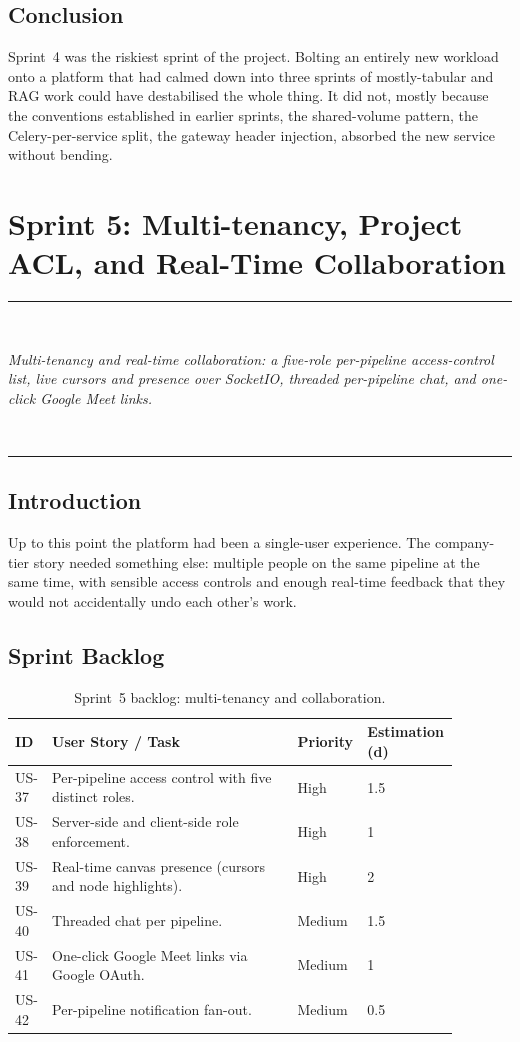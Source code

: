 \documentclass[12pt, a4paper, oneside]{report}
\newcommand{\chapterabstract}[1]{%
  \vspace*{1.2cm}%
  \begin{center}%
  \rule{0.45\textwidth}{0.4pt}\\[0.8em]%
  \begin{minipage}{0.82\textwidth}\centering\itshape\large #1\end{minipage}\\[0.8em]%
  \rule{0.45\textwidth}{0.4pt}%
  \end{center}%
  \vspace*{\fill}\clearpage}
\begin{document}
\section*{Conclusion}

Sprint~4 was the riskiest sprint of the project. Bolting an entirely
new workload onto a platform that had calmed down into three sprints
of mostly-tabular and RAG work could have destabilised the whole
thing. It did not, mostly because the conventions established in
earlier sprints, the shared-volume pattern, the Celery-per-service
split, the gateway header injection, absorbed the new service
without bending.

\chapter{Sprint 5: Multi-tenancy, Project ACL, and Real-Time Collaboration}
\chapterabstract{Multi-tenancy and real-time collaboration: a five-role
per-pipeline access-control list, live cursors and presence over SocketIO,
threaded per-pipeline chat, and one-click Google Meet links.}

\section*{Introduction}

Up to this point the platform had been a single-user experience.
The company-tier story needed something else: multiple people on the
same pipeline at the same time, with sensible access controls and
enough real-time feedback that they would not accidentally undo each
other's work.

\section{Sprint Backlog}

\begin{table}[H]
\centering
\caption{Sprint~5 backlog: multi-tenancy and collaboration.}
\label{tab:sprint5_backlog}
\begin{tabular}{|p{0.05\linewidth}|L{0.55\linewidth}|p{0.1\linewidth}|p{0.18\linewidth}|}
\hline
\textbf{ID} & \textbf{User Story / Task} & \textbf{Priority} & \textbf{Estimation (d)} \\
\hline
US-37 & Per-pipeline access control with five distinct roles. & High & 1.5 \\ \hline
US-38 & Server-side and client-side role enforcement. & High & 1 \\ \hline
US-39 & Real-time canvas presence (cursors and node highlights). & High & 2 \\ \hline
US-40 & Threaded chat per pipeline. & Medium & 1.5 \\ \hline
US-41 & One-click Google Meet links via Google OAuth. & Medium & 1 \\ \hline
US-42 & Per-pipeline notification fan-out. & Medium & 0.5 \\
\hline
\end{tabular}
\end{table}
\end{document}
